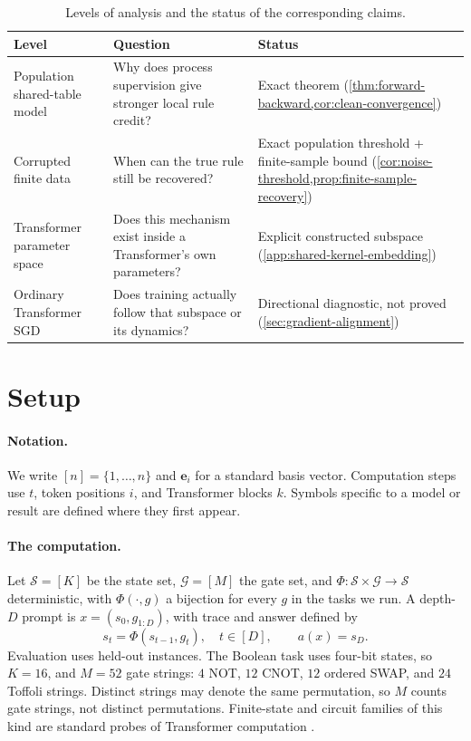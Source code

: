 \begin{table}[h]
\small
\centering
\begin{tabular}{@{}p{2.6cm}p{5.6cm}p{4.1cm}@{}}
\toprule
Level & Question & Status \\
\midrule
Population shared-table model & Why does process supervision give stronger local rule credit? & Exact theorem (\cref{thm:forward-backward,cor:clean-convergence}) \\
Corrupted finite data & When can the true rule still be recovered? & Exact population threshold + finite-sample bound (\cref{cor:noise-threshold,prop:finite-sample-recovery}) \\
Transformer parameter space & Does this mechanism exist inside a Transformer's own parameters? & Explicit constructed subspace (\cref{app:shared-kernel-embedding}) \\
Ordinary Transformer SGD & Does training actually follow that subspace or its dynamics? & Directional diagnostic, not proved (\cref{sec:gradient-alignment}) \\
\bottomrule
\end{tabular}
\caption{Levels of analysis and the status of the corresponding claims.}
\label{tab:closure-ladder}
\end{table}

\section{Setup}
\label{sec:background}
\label{sec:background-circuits}
\label{sec:background-supervision}

\paragraph{Notation.}
We write $[n]=\{1,\ldots,n\}$ and $\bm{e}_i$ for a standard basis vector.
Computation steps use $t$, token positions $i$, and Transformer blocks $k$.
Symbols specific to a model or result are defined where they first appear.

\paragraph{The computation.}
Let $\mathcal S=[K]$ be the state set, $\mathcal G=[M]$ the gate set, and
$\Phi:\mathcal S\times\mathcal G\to\mathcal S$ deterministic, with $\Phi(\cdot,g)$
a bijection for every $g$ in the tasks we run. A depth-$D$ prompt is
$x=(s_0,g_{1:D})$, with trace and answer defined by
\begin{equation}
 s_t=\Phi(s_{t-1},g_t),\quad t\in[D],\qquad a(x)=s_D.
 \label{eq:computation}
\end{equation}
Evaluation uses held-out instances.  The Boolean task uses four-bit states, so $K=16$, and
$M=52$ gate strings: $4$ NOT, $12$ CNOT, $12$ ordered SWAP, and $24$ Toffoli
strings. Distinct strings may denote the same permutation, so $M$ counts gate
strings, not distinct permutations.  Finite-state and circuit families of
this kind are standard probes of Transformer computation
\citep{liu2023automata,deletang2023chomsky,zhou2024algorithms}.

